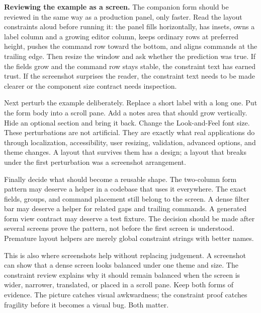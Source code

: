 \textbf{Reviewing the example as a screen.}
The companion form should be reviewed in the same way as a production panel,
only faster. Read the layout constraints aloud before running it: the panel
fills horizontally, has insets, owns a label column and a growing editor column,
keeps ordinary rows at preferred height, pushes the command row toward the
bottom, and aligns commands at the trailing edge. Then resize the window and
ask whether the prediction was true. If the fields grow and the command row
stays stable, the constraint text has earned trust. If the screenshot surprises
the reader, the constraint text needs to be made clearer or the component size
contract needs inspection.

Next perturb the example deliberately. Replace a short label with a long one.
Put the form body into a scroll pane. Add a notes area that should grow
vertically. Hide an optional section and bring it back. Change the Look-and-Feel
font size. These perturbations are not artificial. They are exactly what real
applications do through localization, accessibility, user resizing, validation,
advanced options, and theme changes. A layout that survives them has a design;
a layout that breaks under the first perturbation was a screenshot arrangement.

Finally decide what should become a reusable shape. The two-column form pattern
may deserve a helper in a codebase that uses it everywhere. The exact fields,
groups, and command placement still belong to the screen. A dense filter bar may
deserve a helper for related gaps and trailing commands. A generated form view
contract may deserve a test fixture. The decision should be made after several
screens prove the pattern, not before the first screen is understood. Premature
layout helpers are merely global constraint strings with better names.

This is also where screenshots help without replacing judgement. A screenshot
can show that a dense screen looks balanced under one theme and size. The
constraint review explains why it should remain balanced when the screen is
wider, narrower, translated, or placed in a scroll pane. Keep both forms of
evidence. The picture catches visual awkwardness; the constraint proof catches
fragility before it becomes a visual bug.
Both matter.

